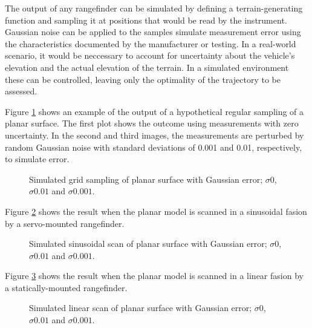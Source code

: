 \documentclass[10pt,a4paper]{report}
\begin{document}
The output of any rangefinder can be simulated by defining a terrain-generating function and sampling it at positions that would be read by the instrument. Gaussian noise can be applied to the samples simulate measurement error using the characteristics documented by the manufacturer or testing. In a real-world scenario, it would be neccessary to account for uncertainty about the vehicle's elevation and the actual elevation of the terrain. In a simulated environment these can be controlled, leaving only the optimality of the trajectory to be assessed.

Figure \ref{fig:point_plane} shows an example of the output of a hypothetical regular sampling of a planar surface. The first plot shows the outcome using measurements with zero uncertainty. In the second and third images, the measurements are perturbed by random Gaussian noise with standard deviations of 0.001 and 0.01, respectively, to simulate error.

\begin{figure}
\centering
\def\svgscale{0.25}

\def\svgscale{0.25}

\def\svgscale{0.25}

\caption{Simulated grid sampling of planar surface with Gaussian error; $\sigma 0$, $\sigma 0.01$ and $\sigma 0.001$.}
\label{fig:point_plane}
\end{figure}


Figure \ref{fig:sinus_plane} shows the result when the planar model is scanned in a sinusoidal fasion by a servo-mounted rangefinder.

\begin{figure}
\centering
\def\svgscale{0.25}

\def\svgscale{0.25}

\def\svgscale{0.25}

\caption{Simulated sinusoidal scan of planar surface with Gaussian error; $\sigma 0$, $\sigma 0.01$ and $\sigma 0.001$.}
\label{fig:sinus_plane}
\end{figure}


Figure \ref{fig:linear_plane} shows the result when the planar model is scanned in a linear fasion by a statically-mounted rangefinder.

\begin{figure}
\centering
\def\svgscale{0.25}

\def\svgscale{0.25}

\def\svgscale{0.25}

\caption{Simulated linear scan of planar surface with Gaussian error; $\sigma 0$, $\sigma 0.01$ and $\sigma 0.001$.}
\label{fig:linear_plane}
\end{figure}
\end{document}
